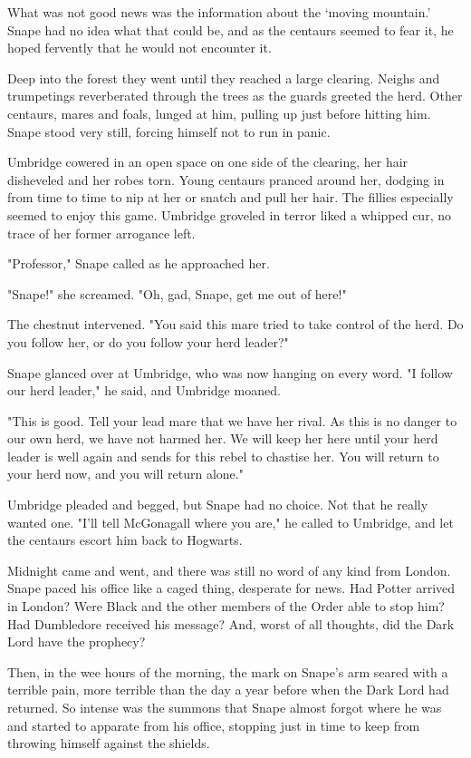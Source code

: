 What was not good news was the information about the `moving mountain.' Snape had no idea what that could be, and as the centaurs seemed to fear it, he hoped fervently that he would not encounter it.

Deep into the forest they went until they reached a large clearing. Neighs and trumpetings reverberated through the trees as the guards greeted the herd. Other centaurs, mares and foals, lunged at him, pulling up just before hitting him. Snape stood very still, forcing himself not to run in panic.

Umbridge cowered in an open space on one side of the clearing, her hair disheveled and her robes torn. Young centaurs pranced around her, dodging in from time to time to nip at her or snatch and pull her hair. The fillies especially seemed to enjoy this game. Umbridge groveled in terror liked a whipped cur, no trace of her former arrogance left.

"Professor," Snape called as he approached her.

"Snape!" she screamed. "Oh, gad, Snape, get me out of here!"

The chestnut intervened. "You said this mare tried to take control of the herd. Do you follow her, or do you follow your herd leader?"

Snape glanced over at Umbridge, who was now hanging on every word. "I follow our herd leader," he said, and Umbridge moaned.

"This is good. Tell your lead mare that we have her rival. As this is no danger to our own herd, we have not harmed her. We will keep her here until your herd leader is well again and sends for this rebel to chastise her. You will return to your herd now, and you will return alone."

Umbridge pleaded and begged, but Snape had no choice. Not that he really wanted one. "I'll tell McGonagall where you are," he called to Umbridge, and let the centaurs escort him back to Hogwarts.

Midnight came and went, and there was still no word of any kind from London. Snape paced his office like a caged thing, desperate for news. Had Potter arrived in London? Were Black and the other members of the Order able to stop him? Had Dumbledore received his message? And, worst of all thoughts, did the Dark Lord have the prophecy?

Then, in the wee hours of the morning, the mark on Snape's arm seared with a terrible pain, more terrible than the day a year before when the Dark Lord had returned. So intense was the summons that Snape almost forgot where he was and started to apparate from his office, stopping just in time to keep from throwing himself against the shields.

